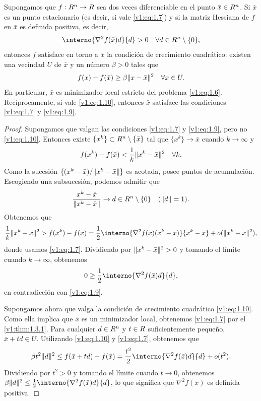 \begin{theorem}\label{v1:thm:1.3.3}
 Supongamos que $f : R^n \to R$ sea dos veces diferenciable en el punto $\bar{x} \in R^n$. Si $\bar{x}$ es un punto estacionario (es decir, si vale \eqref{v1:eq:1.7}) y si la matriz Hessiana de $f$ en $\bar{x}$ es definida positiva, es decir,
 \begin{equation}
 \interno{\nabla^2 f(\bar{x})d}{d} > 0 \quad \forall d \in \Rn \setminus \{0\}, \label{v1:eq:1.9}
 \end{equation}
 entonces $f$ satisface en torno a $\bar{x}$ la condición de crecimiento cuadrático: existen una vecindad $U$ de $\bar{x}$ y un número $\beta > 0$ tales que
 \begin{equation}
 f(x) - f(\bar{x}) \ge \beta \lVert x - \bar{x}\rVert^2 \quad \forall x \in U. \label{v1:eq:1.10}
 \end{equation}
 En particular, $\bar{x}$ es minimizador local estricto del problema \eqref{v1:eq:1.6}. Recíprocamente, si vale \eqref{v1:eq:1.10}, entonces $\bar{x}$ satisface las condiciones \eqref{v1:eq:1.7} y \eqref{v1:eq:1.9}.
\end{theorem}

\begin{proof}
 Supongamos que valgan las condiciones \eqref{v1:eq:1.7} y \eqref{v1:eq:1.9}, pero no \eqref{v1:eq:1.10}. Entonces existe $\{x^k\} \subset R^n \setminus \{\bar{x}\}$ tal que $\{x^k\} \to \bar{x}$ cuando $k \to \infty$ y
 \[
 f(x^k) - f(\bar{x}) < \frac{1}{k} \lVert x^k - \bar{x}\rVert^2 \quad \forall k.
 \]
 Como la sucesión $\{(x^k - \bar{x}) / \lVert x^k - \bar{x}\rVert\}$ es acotada, posee puntos de acumulación. Escogiendo una subsucesión, podemos admitir que
 \[
 \frac{x^k - \bar{x}}{\lVert x^k - \bar{x}\rVert} \to d \in R^n \setminus \{0\} \quad (\lVert d\rVert = 1).
 \]
 Obtenemos que
 \[
 \frac{1}{k} \norm{x^k - \bar{x}}^2 > f(x^k) - f(\bar{x})
 = \frac{1}{2}\interno{\nabla^2 f(\bar{x})(x^k - \bar{x})}{x^k - \bar{x}} + o(\norm{x^k - \bar{x}}^2),
 \]
 donde usamos \eqref{v1:eq:1.7}. Dividiendo por $\lVert x^k - \bar{x}\rVert^2 > 0$ y tomando el límite cuando $k \to \infty$, obtenemos
 \[
 0 \ge \frac{1}{2} \interno{\nabla^2 f(\bar{x})d}{d},
 \]
 en contradicción con \eqref{v1:eq:1.9}.

 Supongamos ahora que valga la condición de crecimiento cuadrático \eqref{v1:eq:1.10}. Como ella implica que $\bar{x}$ es un minimizador local, obtenemos \eqref{v1:eq:1.7} por el \cref{v1:thm:1.3.1}. Para cualquier $d \in R^n$ y $t \in R$ suficientemente pequeño, $\bar{x} + td \in U$. Utilizando \eqref{v1:eq:1.10} y \eqref{v1:eq:1.7}, obtenemos que
 \[
 \beta t^2 \norm{d}^2 \le f(\bar{x} + td) - f(\bar{x})
 = \frac{t^2}{2}\interno{\nabla^2 f(\bar{x})d}{d} + o(t^2).
 \]
 Dividiendo por $t^2 > 0$ y tomando el límite cuando $t \to 0$, obtenemos
 $\beta \norm{d}^2 \le \frac{1}{2}\interno{\nabla^2 f(\bar{x})d}{d}$, lo que significa que $\nabla^2 f(\bar{x})$ es definida positiva.
\end{proof}

